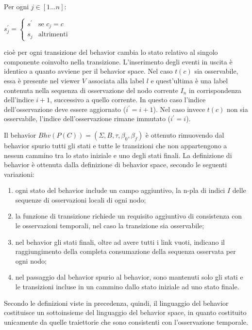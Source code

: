 \begin{defn}
\begin{itemize}
Per ogni $j \in [1 \ldots n]$:
\begin{center}
$s^\prime_j = \begin{cases} s^\prime & \mbox{se }c_j = c\\ s_j & \mbox{altrimenti} \end{cases}$
\end{center}
cioè per ogni transizione del behavior cambia lo stato relativo al singolo componente coinvolto nella transizione.
L'inserimento degli eventi in uscita è identico a quanto avviene per il behavior space.
Nel caso $t(c)$ sia osservabile, essa è presente nel viewer $V$ associata alla label $l$ e quest'ultima è una label contenuta nella sequenza di osservazione del nodo corrente $I_n$ in corrispondenza dell'indice $i+1$, successivo a quello corrente. In questo caso l'indice dell'osservazione deve essere aggiornato ($i^\prime = i+1$). Nel caso invece $t(c)$ non sia osservabile, l'indice dell'osservazione rimane immutato ($i^\prime = i$).
\end{itemize}
\end{defn}

Il behavior $Bhv(P(C)) = (\Sigma,B,\tau,\beta_0,\beta_f)$ è ottenuto rimuovendo dal behavior spurio tutti gli stati e tutte le transizioni che non appartengono a nessun cammino tra lo stato iniziale e uno degli stati finali.
La definizione di behavior è ottenuta dalla definizione di behavior space, secondo le seguenti variazioni:
\begin{enumerate}
\item ogni stato del behavior include un campo aggiuntivo, la n-pla di indici $I$ delle sequenze di osservazioni locali di ogni nodo;
\item la funzione di transizione richiede un requisito aggiuntivo di consistenza con le osservazioni temporali, nel caso la transizione sia osservabile;
\item nel behavior gli stati finali, oltre ad avere tutti i link vuoti, indicano il raggiungimento della completa consumazione della sequenza osservata per ogni nodo; 
\item nel passaggio dal behavior spurio al behavior, sono mantenuti solo gli stati e le transizioni incluse in un cammino dallo stato iniziale ad uno stato finale.
\end{enumerate}
Secondo le definizioni viste in precedenza, quindi, il linguaggio del behavior costituisce un sottoinsieme del linguaggio del behavior space, in quanto costituito unicamente da quelle traiettorie che sono consistenti con l'osservazione temporale.


